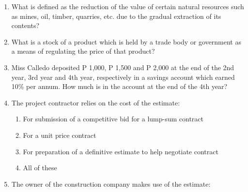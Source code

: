 \documentclass[11pt,a4paper]{article}
\begin{document}
\begin{enumerate}
\item{What is defined as the reduction of the value of certain natural resources such as mines, oil, timber, quarries, etc. due to the gradual extraction of its contents?}
\\
\item{What is a stock of a product which is held by a trade body or government as a means of regulating the price of that product?}
\\
\item{Miss Calledo deposited P 1,000, P 1,500 and P 2,000 at the end of the 2nd year, 3rd year and 4th year, respectively in a savings account which earned 10\% per annum. How much is in the account at the end of the 4th year?}
\\
\item{The project contractor relies on the cost of the estimate:}
\begin{enumerate}[label=\Alph*.]
\item{For submission of a competitive bid for a lump-sum contract}
\item{For a unit price contract}
\item{For preparation of a definitive estimate to help negotiate contract}
\item{All of these}
\end{enumerate}
\item{The owner of the construction company makes use of the estimate:}

\end{enumerate}
\end{document}

